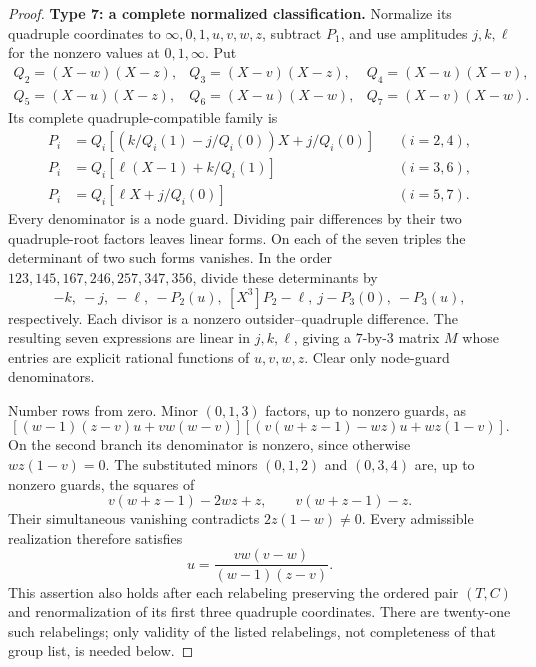 \begin{proof}
\smallskip\noindent\textbf{Type 7: a complete normalized classification.}
Normalize its quadruple coordinates to $\infty,0,1,u,v,w,z$, subtract
$P_1$, and use amplitudes $j,k,\ell$ for the nonzero values at
$0,1,\infty$.  Put
\[
\begin{array}{lll}
 Q_2=(X-w)(X-z),&Q_3=(X-v)(X-z),&Q_4=(X-u)(X-v),\\
 Q_5=(X-u)(X-z),&Q_6=(X-u)(X-w),&Q_7=(X-v)(X-w).
\end{array}
\]
Its complete quadruple-compatible family is
\begin{align*}
 P_i&=Q_i[(k/Q_i(1)-j/Q_i(0))X+j/Q_i(0)] &&(i=2,4),\\
 P_i&=Q_i[\ell(X-1)+k/Q_i(1)] &&(i=3,6),\\
 P_i&=Q_i[\ell X+j/Q_i(0)] &&(i=5,7).
\end{align*}
Every denominator is a node guard.
Dividing pair differences by their two quadruple-root factors
leaves linear forms.  On each of the seven triples the determinant of
two such forms vanishes.  In the order
$123,145,167,246,257,347,356$, divide these determinants by
\[
 -k,\ -j,\ -\ell,\ -P_2(u),\ [X^3]P_2-\ell,
 \ j-P_3(0),\ -P_3(u),                         \tag{G3}
\]
respectively.  Each divisor is a nonzero outsider--quadruple difference.
The resulting seven expressions are linear in $j,k,\ell$, giving a
$7$-by-$3$ matrix $M$ whose entries are explicit rational functions of
$u,v,w,z$.  Clear only node-guard denominators.

Number rows from zero.  Minor $(0,1,3)$ factors, up to nonzero guards, as
\[
 [(w-1)(z-v)u+vw(w-v)]
 [(v(w+z-1)-wz)u+wz(1-v)].                    \tag{G4}
\]
On the second branch its denominator is nonzero, since otherwise
$wz(1-v)=0$.  The substituted minors $(0,1,2)$ and $(0,3,4)$ are, up to
nonzero guards, the squares of
\[
 v(w+z-1)-2wz+z,\qquad v(w+z-1)-z.
\]
Their simultaneous vanishing contradicts $2z(1-w)\ne0$.  Every
admissible realization therefore satisfies
\[
 u=\frac{vw(v-w)}{(w-1)(z-v)}.                \tag{G5}
\]
This assertion also holds after each relabeling preserving the ordered
pair $(T,C)$ and renormalization of its first three quadruple coordinates.
There are twenty-one such relabelings; only validity of the listed
relabelings, not completeness of that group list, is needed below.


\end{proof}
